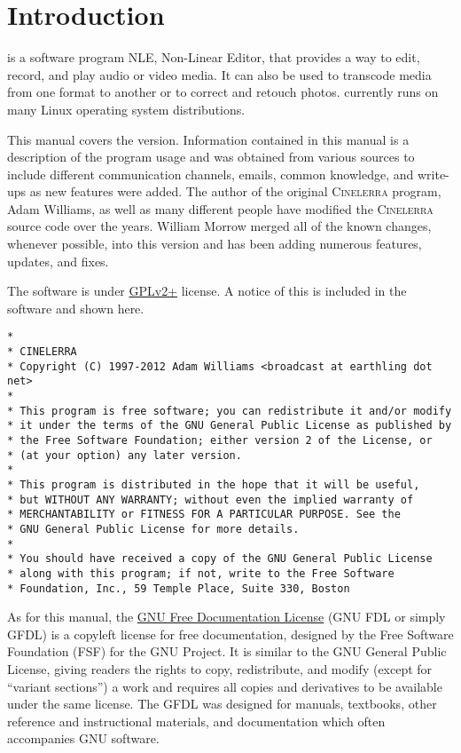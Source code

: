 \chapter*{Introduction}%
\label{cha:introduction}

\CGG{} is a software program NLE, Non-Linear Editor, that provides a
way to edit, record, and play audio or video media.  It can also be
used to transcode media from one format to another or to correct and
retouch photos. \CGG{} currently runs on many Linux operating system
distributions.

This manual covers the \CGG{} \INF{} version.  Information
contained in this manual is a description of the \CGG{} program
usage and was obtained from various sources to include different
communication channels, emails, common knowledge, and write-ups as
new features were added.  The author of the original
\textsc{Cinelerra} program, Adam Williams, as well as many different
people have modified the \textsc{Cinelerra} source code over the
years.  William Morrow merged all of the known changes, whenever
possible, into this \CGG{} version and has been adding numerous
features, updates, and fixes.

The \CGG{} software is under
\href{https://www.gnu.org/licenses/old-licenses/gpl-2.0-standalone.html}{GPLv2+}
license. A notice of this is included in the software and shown here.

\begin{lstlisting}[basicstyle=\footnotesize]
*
* CINELERRA
* Copyright (C) 1997-2012 Adam Williams <broadcast at earthling dot net>
*
* This program is free software; you can redistribute it and/or modify
* it under the terms of the GNU General Public License as published by
* the Free Software Foundation; either version 2 of the License, or
* (at your option) any later version.
*
* This program is distributed in the hope that it will be useful,
* but WITHOUT ANY WARRANTY; without even the implied warranty of
* MERCHANTABILITY or FITNESS FOR A PARTICULAR PURPOSE. See the
* GNU General Public License for more details.
*
* You should have received a copy of the GNU General Public License
* along with this program; if not, write to the Free Software
* Foundation, Inc., 59 Temple Place, Suite 330, Boston
\end{lstlisting}

As for this manual, the
\href{https://www.gnu.org/licenses/fdl-1.3.en.html}{GNU Free
  Documentation License} (GNU FDL or simply GFDL) is a copyleft
license for free documentation, designed by the Free Software
Foundation (FSF) for the GNU Project. It is similar to the GNU
General Public License, giving readers the rights to copy,
redistribute, and modify (except for ``variant sections'') a work
and requires all copies and derivatives to be available under the
same license.  The GFDL was designed for manuals, textbooks, other
reference and instructional materials, and documentation which often
accompanies GNU software.

